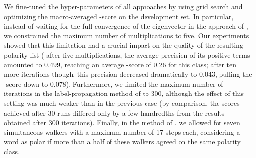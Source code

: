 We fine-tuned the hyper-parameters of all approaches by using grid
search and optimizing the macro-averaged \F{}-score on the development
set.  In particular, instead of waiting for the full convergence of
the eigenvector in the approach of \citet{Blair-Goldensohn:08}, we
constrained the maximum number of multiplications to five.  Our
experiments showed that this limitation had a crucial impact on the
quality of the resulting polarity list (\eg{} after five
multiplications, the average precision of its positive terms amounted
to 0.499, reaching an average \F{}-score of 0.26 for this class; after
ten more iterations though, this precision decreased dramatically to
0.043, pulling the \F{}-score down to 0.078).  Furthermore, we limited
the maximum number of iterations in the label-propagation method of
\citet{Rao:09} to 300, although the effect of this setting was much
weaker than in the previous case (by comparison, the scores achieved
after 30 runs differed only by a few hundredths from the results
obtained after 300 iterations).  Finally, in the method of
\citet{Awadallah:10}, we allowed for seven simultaneous walkers with a
maximum number of 17 steps each, considering a word as polar if more
than a half of these walkers agreed on the same polarity class.

